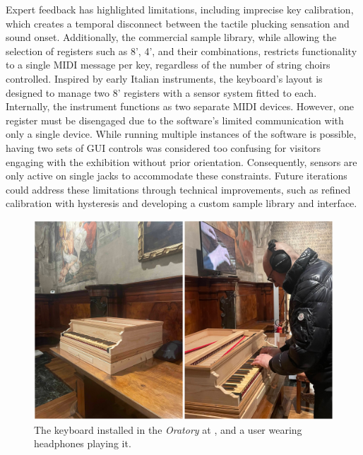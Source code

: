 Expert feedback has highlighted limitations, including imprecise key calibration, which creates a temporal disconnect between the tactile plucking sensation and sound onset. Additionally, the commercial sample library, while allowing the selection of registers such as 8', 4', and their combinations, restricts functionality to a single MIDI message per key, regardless of the number of string choirs controlled. Inspired by early Italian instruments, the keyboard's layout is designed to manage two 8' registers with a sensor system fitted to each. Internally, the instrument functions as two separate MIDI devices. However, one register must be disengaged due to the software's limited communication with only a single device. While running multiple instances of the software is possible, having two sets of GUI controls was considered too confusing for visitors engaging with the exhibition without prior orientation. Consequently, sensors are only active on single jacks to accommodate these constraints. Future iterations could address these limitations through technical improvements, such as refined calibration with hysteresis and developing a custom sample library and interface.


\begin{figure}
\centering
\includegraphics[width = \linewidth]{src/images/keyboardMuseum.JPEG}
\caption{The keyboard installed in the \emph{Oratory} at , and a user wearing headphones playing it.}
\label{fig:oratory}
\end{figure}

